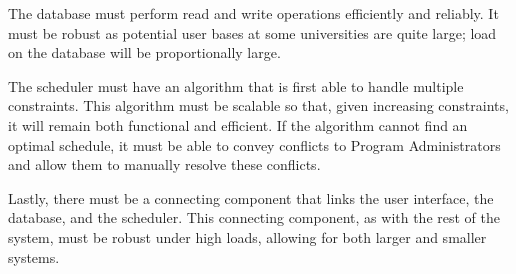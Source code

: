 \documentclass[12pt]{article}
\begin{document}
The database must perform read and write operations efficiently and reliably. It must be robust as potential user bases at some universities are quite large; load on the database will be proportionally large. 

The scheduler must have an algorithm that is first able to handle multiple constraints. This algorithm must be scalable so that, given increasing constraints, it will remain both functional and efficient. If the algorithm cannot find an optimal schedule, it must be able to convey conflicts to Program Administrators and allow them to manually resolve these conflicts.

Lastly, there must be a connecting component that links the user interface, the database, and the scheduler. This connecting component, as with the rest of the system, must be robust under high loads, allowing for both larger and smaller systems.
\end{document}

